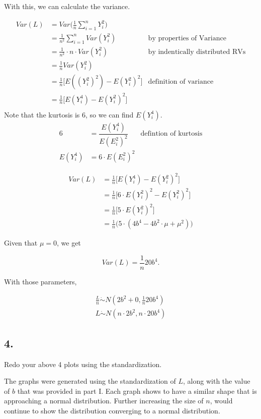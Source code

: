 \documentclass[12pt]{article}
\begin{document}
With this, we can calculate the variance.

\begin{align*}
	Var(L)  & = Var \Big( \frac{ 1 }{ n } \sum_{i = 1}^{n} Y_i^2 \Big) \\
		& = \frac{ 1 }{ n^2 } \sum_{i = 1}^{n} Var(  Y_i^2)  & \text{by properties of Variance}\\
		& =  \frac{ 1 }{ n^2 }\cdot  n \cdot Var(  Y_i^2) & \text{by indentically distributed RVs}\\
		& = \frac{ 1 }{ n }Var(Y_i^2) \\
		& = \frac{ 1 }{ n } \Big[ E( (Y_i^2)^2) - E(Y_i^2)^2  \Big] & \text{definition of variance} \\
		& = \frac{ 1 }{ n } \Big[ E( Y_i^4) - E(Y_i^2)^2  \Big] \\
\end{align*}
Note that the kurtosis is 6, so we can find  $E(Y_i^4)$.
\begin{align*}
	6 & = \dfrac{E(Y_i^4)}{E(E_i^2)^2} & \text{defintion of kurtosis} \\
	E(Y_i^4) & = 6 \cdot E(E_i^2)^2
\end{align*}

\begin{align*}
Var(L) & =  \frac{ 1 }{ n } \Big[ E( Y_i^4) - E(Y_i^2)^2  \Big] \\
	& =  \frac{ 1 }{ n } \Big[ 6 \cdot E(Y_i^2)^2 - E(Y_i^2)^2  \Big] \\
	& =  \frac{ 1 }{ n } \Big[ 5 \cdot E(Y_i^2)^2  \Big] \\
	& = \frac{ 1 }{ n } \Big( 5\cdot (4b^4 - 4b^2\cdot \mu + \mu^2 ) \Big)
\end{align*}

Given that $\mu = 0$, we get

$$Var(L)  = \frac{ 1 }{ n } 20b^4.$$

With those parameters, 

\begin{align*}
	\frac{ L }{ n } \dot{\sim} N(2b^2+0, \frac{ 1 }{ n } 20b^4)\\
	L \dot{\sim} N ( n\cdot 2b^2, n\cdot 20b^4)
\end{align*}

\subsection{4.}
Redo your above 4 plots using the standardization.

The graphs were generated using the standardization of $L$, along with the value of $b$ that was provided in part I. Each graph shows to have a similar shape that is approaching a normal distribution. Further increasing the size of $n$, would continue to show the distribution converging to a normal distribution. 
\end{document}
